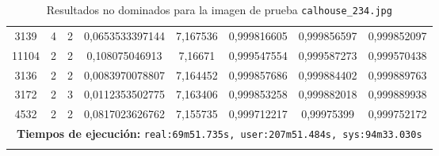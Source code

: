 \begin{longtable}{|c|c|c|c|c|c|c|c|}
3139 & 4 & 2 & 0,0653533397144 & 7,167536 & 0,999816605 & 0,999856597 & 0,999852097 \\
11104 & 2 & 2 & 0,108075046913 & 7,16671 & 0,999547554 & 0,999587273 & 0,999570438 \\
3136 & 2 & 2 & 0,0083970078807 & 7,164452 & 0,999857686 & 0,999884402 & 0,999889763 \\
3172 & 2 & 3 & 0,0112353502775 & 7,163406 & 0,999853258 & 0,999882018 & 0,999889938 \\
4532 & 2 & 2 & 0,0817023626762 & 7,155735 & 0,999712217 & 0,99975399 & 0,999752172 \\
\hline
\multicolumn{8}{|c|}{\textbf{Tiempos de ejecución:} \texttt{real:69m51.735s, user:207m51.484s, sys:94m33.030s}}\\ \hline
\caption{Resultados no dominados para la imagen de prueba \texttt{calhouse\_234.jpg}}
\label{tab:calhouse_234}
\end{longtable}
\normalsize

